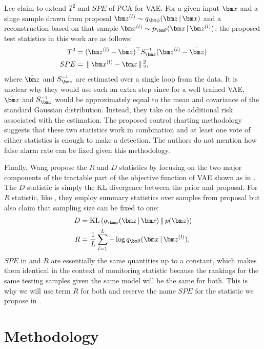 \documentclass[journal, peerreview]{IEEEtran}
\begin{document}
Lee \etal \cite{lee2019process} claim to extend $T^2$ and $SPE$ of PCA for VAE.
For a given input $\mbx$ and a singe sample drawn from proposal $\mbz^{(l)} \sim \encoding$ and a reconstruction based on that sample $\mbx^{(l)} \sim p_{\mbtheta}(\mbx \g \mbz^{(l)})$, the proposed test statistics in this work are as follows:
\begin{equation}
\begin{aligned}
    T^{2} &= (\mbz^{(l)} - \bar{\mbz})^{\top}S_{\mbz}\inv(\mbz^{(l)} - \bar{\mbz}) \\
    SPE &= \gg \mbx^{(l)} - \mbx \gg_{2}^{2},
\end{aligned}
\end{equation}
where $\bar{\mbz}$ and $S_{\mbz}\inv$ are estimated over a single loop from the data. It is unclear why they would use such an extra step since for a well trained VAE, $\bar{\mbz}$ and $S_{\mbz}\inv$ would be approximately equal to the mean and covariance of the standard Gaussian distribution.
Instead, they take on the additional risk associated with the estimation.
The proposed control charting methodology suggests that these two statistics work in combination and at least one vote of either statistics is enough to make a detection.
The authors do not mention how false alarm rate can be fixed given this methodology.

Finally, Wang \etal propose the $R$ and $D$ statistics by focusing on the two major components of the tractable part of the objective function of VAE shown as in .
The $D$ statistic is simply the KL divergence between the prior and proposal.
For $R$ statistic, like \cite{lee2019process}, they employ summary statistics over samples from proposal but also claim that sampling size can be fixed to one:
\begin{equation}
\begin{aligned}
    D &= \KL{\encoding}{p(\mbz)} \\
    R &= \frac{1}{L} \sum_{l=1}^{L} -\log q_{\mbtheta}(\mbx \g \mbz^{(l)}),
\end{aligned}
\label{eq: DR}
\end{equation}
$SPE$ in and $R$ are essentially the same quantities up to a constant, which makes them identical in the context of monitoring statistic because the rankings for the same testing samples given the same model will be the same for both.
This is why we will use term $R$ for both and reserve the name $SPE$ for the statistic we propose in .
\section{Methodology}
\label{sec:methodology}
\end{document}
